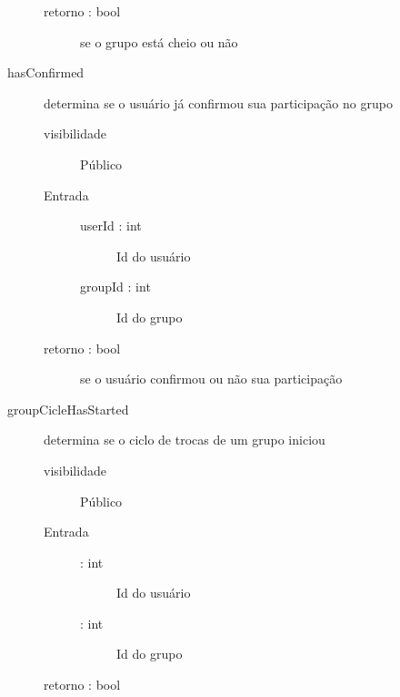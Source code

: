 \documentclass[a4paper]{article}
\begin{document}
\begin{description}
\begin{description}
			 \item [retorno : bool ] se o grupo está cheio ou não
				
			\end{description} %
			
			\item [hasConfirmed] determina se o usuário já confirmou sua participação no grupo
			\begin{description} %
			 \item [visibilidade] Público
			 \item [Entrada] \mbox{}
				\begin{description} %
				 \item [userId : int] Id do usuário
				 \item [groupId : int] Id do grupo
				\end{description} %
				
			 \item [retorno : bool ] se o usuário confirmou ou não sua participação
				
			\end{description} %
			
			\item [groupCicleHasStarted] determina se o ciclo de trocas de um grupo iniciou
			\begin{description} %
			 \item [visibilidade] Público
			 \item [Entrada] \mbox{}
				\begin{description} %
				 \item [ : int] Id do usuário
				 \item [ : int] Id do grupo
				\end{description} %
				
			 \item [retorno : bool ] 
				
			\end{description} %
			
		\end{description} %
 
\end{document}
